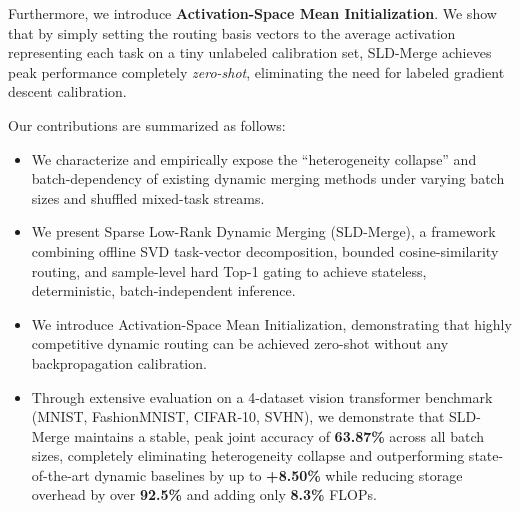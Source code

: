 Furthermore, we introduce \textbf{Activation-Space Mean Initialization}. We show that by simply setting the routing basis vectors to the average activation representing each task on a tiny unlabeled calibration set, SLD-Merge achieves peak performance completely \emph{zero-shot}, eliminating the need for labeled gradient descent calibration.

Our contributions are summarized as follows:
\begin{itemize}
    \item We characterize and empirically expose the ``heterogeneity collapse'' and batch-dependency of existing dynamic merging methods under varying batch sizes and shuffled mixed-task streams.
    \item We present Sparse Low-Rank Dynamic Merging (SLD-Merge), a framework combining offline SVD task-vector decomposition, bounded cosine-similarity routing, and sample-level hard Top-1 gating to achieve stateless, deterministic, batch-independent inference.
    \item We introduce Activation-Space Mean Initialization, demonstrating that highly competitive dynamic routing can be achieved zero-shot without any backpropagation calibration.
    \item Through extensive evaluation on a 4-dataset vision transformer benchmark (MNIST, FashionMNIST, CIFAR-10, SVHN), we demonstrate that SLD-Merge maintains a stable, peak joint accuracy of \textbf{63.87\%} across all batch sizes, completely eliminating heterogeneity collapse and outperforming state-of-the-art dynamic baselines by up to \textbf{+8.50\%} while reducing storage overhead by over \textbf{92.5\%} and adding only \textbf{8.3\%} FLOPs.
\end{itemize}
